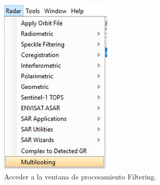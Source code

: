 \documentclass{article}
\begin{document}
\begin{figure}[htbp]
\begin{minipage}[b]{0.3\linewidth}
\centering
\includegraphics[width=\linewidth]{Imagen/15.JPG}
\caption{Acceder a la ventana de procesamiento Filtering.}
\label{fig:figura15}
\end{minipage}
\hspace{0.5cm}
\begin{minipage}[b]{0.5\linewidth}
\centering

\end{minipage}
\end{figure}
\end{document}
